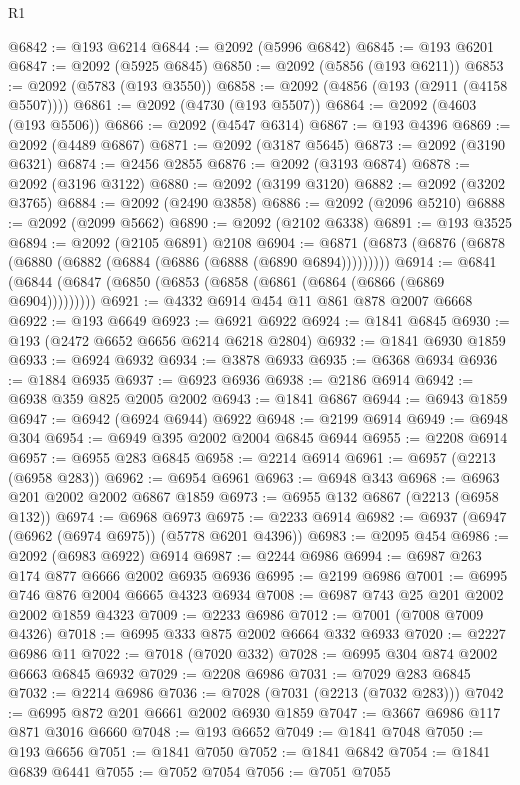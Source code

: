 \begin{lexlean}{R1}
\begin{coremodule}
@6842 := @193 @6214
@6844 := @2092 (@5996 @6842)
@6845 := @193 @6201
@6847 := @2092 (@5925 @6845)
@6850 := @2092 (@5856 (@193 @6211))
@6853 := @2092 (@5783 (@193 @3550))
@6858 := @2092 (@4856 (@193 (@2911 (@4158 @5507))))
@6861 := @2092 (@4730 (@193 @5507))
@6864 := @2092 (@4603 (@193 @5506))
@6866 := @2092 (@4547 @6314)
@6867 := @193 @4396
@6869 := @2092 (@4489 @6867)
@6871 := @2092 (@3187 @5645)
@6873 := @2092 (@3190 @6321)
@6874 := @2456 @2855
@6876 := @2092 (@3193 @6874)
@6878 := @2092 (@3196 @3122)
@6880 := @2092 (@3199 @3120)
@6882 := @2092 (@3202 @3765)
@6884 := @2092 (@2490 @3858)
@6886 := @2092 (@2096 @5210)
@6888 := @2092 (@2099 @5662)
@6890 := @2092 (@2102 @6338)
@6891 := @193 @3525
@6894 := @2092 (@2105 @6891) @2108
@6904 := @6871 (@6873 (@6876 (@6878 (@6880 (@6882 (@6884 (@6886 (@6888 (@6890 @6894)))))))))
@6914 := @6841 (@6844 (@6847 (@6850 (@6853 (@6858 (@6861 (@6864 (@6866 (@6869 @6904)))))))))
@6921 := @4332 @6914 @454 @11 @861 @878 @2007 @6668
@6922 := @193 @6649
@6923 := @6921 @6922
@6924 := @1841 @6845
@6930 := @193 (@2472 @6652 @6656 @6214 @6218 @2804)
@6932 := @1841 @6930 @1859
@6933 := @6924 @6932
@6934 := @3878 @6933
@6935 := @6368 @6934
@6936 := @1884 @6935
@6937 := @6923 @6936
@6938 := @2186 @6914
@6942 := @6938 @359 @825 @2005 @2002
@6943 := @1841 @6867
@6944 := @6943 @1859
@6947 := @6942 (@6924 @6944) @6922
@6948 := @2199 @6914
@6949 := @6948 @304
@6954 := @6949 @395 @2002 @2004 @6845 @6944
@6955 := @2208 @6914
@6957 := @6955 @283 @6845
@6958 := @2214 @6914
@6961 := @6957 (@2213 (@6958 @283))
@6962 := @6954 @6961
@6963 := @6948 @343
@6968 := @6963 @201 @2002 @2002 @6867 @1859
@6973 := @6955 @132 @6867 (@2213 (@6958 @132))
@6974 := @6968 @6973
@6975 := @2233 @6914
@6982 := @6937 (@6947 (@6962 (@6974 @6975)) (@5778 @6201 @4396))
@6983 := @2095 @454
@6986 := @2092 (@6983 @6922) @6914
@6987 := @2244 @6986
@6994 := @6987 @263 @174 @877 @6666 @2002 @6935 @6936
@6995 := @2199 @6986
@7001 := @6995 @746 @876 @2004 @6665 @4323 @6934
@7008 := @6987 @743 @25 @201 @2002 @2002 @1859 @4323
@7009 := @2233 @6986
@7012 := @7001 (@7008 @7009 @4326)
@7018 := @6995 @333 @875 @2002 @6664 @332 @6933
@7020 := @2227 @6986 @11
@7022 := @7018 (@7020 @332)
@7028 := @6995 @304 @874 @2002 @6663 @6845 @6932
@7029 := @2208 @6986
@7031 := @7029 @283 @6845
@7032 := @2214 @6986
@7036 := @7028 (@7031 (@2213 (@7032 @283)))
@7042 := @6995 @872 @201 @6661 @2002 @6930 @1859
@7047 := @3667 @6986 @117 @871 @3016 @6660
@7048 := @193 @6652
@7049 := @1841 @7048
@7050 := @193 @6656
@7051 := @1841 @7050
@7052 := @1841 @6842
@7054 := @1841 @6839 @6441
@7055 := @7052 @7054
@7056 := @7051 @7055

\end{coremodule}
\end{lexlean}
